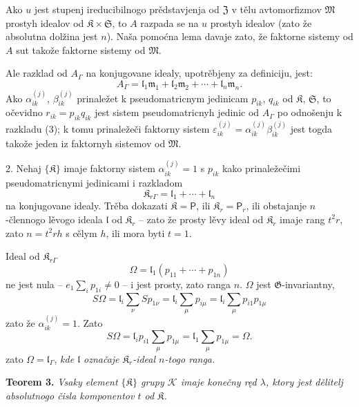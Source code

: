 \documentclass[11pt]{article}
\begin{document}
Ako \(u\) jest stupenj ireducibilnogo prědstavjenja od \(\mathfrak Z\) v tělu avtomorfizmov \(\mathfrak M\) prostyh idealov od \(\mathfrak K\times\mathfrak S\), to \(A\) razpada se na \(u\) prostyh idealov (zato že absolutna dolžina jest \(n\)). Naša pomoćna lema davaje zato, že faktorne sistemy od \(A\) sut takože faktorne sistemy od \(\mathfrak M\).

Ale razklad od \(A_\Gamma\) na konjugovane idealy, upotrěbjeny za definiciju, jest:
\[
\tag{3}
A_\Gamma=\mathfrak l_1\mathfrak m_1+\mathfrak l_2\mathfrak m_2+\cdots+\mathfrak l_n\mathfrak m_n.
\]
Ako \(\alpha_{ik}^{(j)}\), \(\beta_{ik}^{(j)}\) prinaležet k pseudomatricnym jedinicam \(p_{ik}\), \(q_{ik}\) od \(\mathfrak K\), \(\mathfrak S\), to očevidno \(r_{ik}=p_{ik}q_{ik}\) jest sistem pseudomatricnyh jedinic od \(A_\Gamma\) po odnošenju k razkladu (3); k tomu prinaležeči faktorny sistem \(\varepsilon_{ik}^{(j)}=\alpha_{ik}^{(j)}\beta_{ik}^{(j)}\) jest togda takože jeden iz faktornyh sistemov od \(\mathfrak M\).

2. Nehaj \(\{\mathfrak K\}\) imaje faktorny sistem \(\alpha_{ik}^{(j)}=1\) s \(p_{ik}\) kako prinaležečimi pseudomatricnymi jedinicami i razkladom
\[
\mathfrak K_{r\Gamma}=\mathfrak l_1+\cdots+\mathfrak l_n
\]
na konjugovane idealy. Trěba dokazati \(\mathfrak K=\mathsf P\), ili \(\mathfrak K_r=\mathsf P_r\), ili obstajanje \(n\)-člennogo lěvogo ideala \(\mathfrak l\) od \(\mathfrak K_r\) -- zato že prosty lěvy ideal od \(\mathfrak K_r\) imaje rang \(t^2r\), zato \(n=t^2rh\) s cělym \(h\), ili mora byti \(t=1\).

Ideal od \(\mathfrak K_{r\Gamma}\)
\[
\Omega=\mathfrak l_1(p_{11}+\cdots+p_{1n})
\]
ne jest nula -- \(e_1\sum_i p_{1i}\ne0\) -- i jest prosty, zato ranga \(n\). \(\Omega\) jest \(\mathfrak G\)-invariantny,
\[
S\Omega
=\mathfrak l_i\sum_\nu S p_{1\nu}
=\mathfrak l_i\sum_\mu p_{i\mu}
=\mathfrak l_i\sum_\mu p_{i1}p_{1\mu}
\]
zato že \(\alpha_{ik}^{(j)}=1\). Zato
\[
S\Omega=\mathfrak l_ip_{i1}\sum_\mu p_{1\mu}
=\mathfrak l_1\sum_\mu p_{1\mu}
=\Omega.
\]
zato \(\Omega=\mathfrak l_\Gamma\), \emph{kde \(\mathfrak l\) označaje \(\mathfrak K_r\)-ideal \(n\)-togo ranga.}

\textbf{Teorem 3.} \emph{Vsaky element \(\{\mathfrak K\}\) grupy \(\mathscr K\) imaje konečny ręd \(\lambda\), ktory jest dělitelj absolutnogo čisla komponentov \(t\) od \(\mathfrak K\).}
\end{document}
